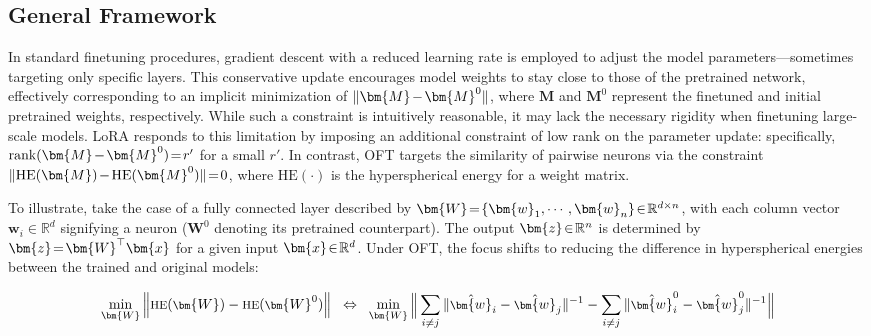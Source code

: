 \subsection{General Framework}

In standard finetuning procedures, gradient descent with a reduced learning rate is employed to adjust the model parameters—sometimes targeting only specific layers. This conservative update encourages model weights to stay close to those of the pretrained network, effectively corresponding to an implicit minimization of $\thickmuskip=2mu \medmuskip=2mu \| \bm{M} - \bm{M}^0\|$, where $\bm{M}$ and $\bm{M}^0$ represent the finetuned and initial pretrained weights, respectively. While such a constraint is intuitively reasonable, it may lack the necessary rigidity when finetuning large-scale models. LoRA responds to this limitation by imposing an additional constraint of low rank on the parameter update: specifically, $\thickmuskip=2mu \medmuskip=2mu \text{rank}(\bm{M} - \bm{M}^0)=r'$ for a small $r'$. In contrast, OFT targets the similarity of pairwise neurons via the constraint $\thickmuskip=2mu \medmuskip=2mu \| \text{HE}(\bm{M})-\text{HE}(\bm{M}^0) \|=0$, where $\text{HE}(\cdot)$ is the hyperspherical energy for a weight matrix.

To illustrate, take the case of a fully connected layer described by $\thickmuskip=2mu \medmuskip=2mu \bm{W}=\{\bm{w}_1,\cdots,\bm{w}_n\}\in\mathbb{R}^{d\times n}$, with each column vector $\bm{w}_i\in\mathbb{R}^d$ signifying a neuron ($\bm{W}^0$ denoting its pretrained counterpart). The output $\thickmuskip=2mu \medmuskip=2mu \bm{z}\in\mathbb{R}^n$ is determined by $\thickmuskip=2mu \medmuskip=2mu \bm{z}=\bm{W}^\top\bm{x}$ for a given input $\thickmuskip=2mu \medmuskip=2mu \bm{x}\in\mathbb{R}^d$. Under OFT, the focus shifts to reducing the difference in hyperspherical energies between the trained and original models:

\begin{equation}\label{eq:oft_principle}
\footnotesize
\min_{\bm{W}} \left\| \text{HE}(\bm{W})-\text{HE}(\bm{W}^0)\right\|~~\Leftrightarrow~~\min_{\bm{W}} \bigg{\|} \sum_{i\neq j} \|\hat{\bm{w}}_i-\hat{\bm{w}}_j\|^{-1}-\sum_{i\neq j} \|\hat{\bm{w}}^0_i-\hat{\bm{w}}^0_j\|^{-1}\bigg{\|}
\end{equation}

